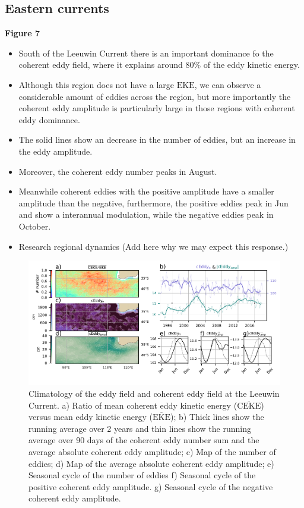 \documentclass[draft,linenumbers]{agujournal2019}
\newcommand{\MEKE}{\overline{\textrm{EKE}}}
\newcommand{\EKE}{\textrm{EKE}}
\newcommand{\MCEKE}{\overline{\textrm{CEKE}}}
\begin{document}
	\subsection{Eastern currents}


	\textbf{Figure 7}
	\begin{itemize}
		\item South of the Leeuwin Current there is an important dominance fo the coherent eddy field, where it explains around 80\% of the eddy kinetic energy.
		\item Although this region does not have a large $\EKE$, we can observe a considerable amount of eddies across the region, but more importantly the coherent eddy amplitude is particularly large in those regions with coherent eddy dominance. 
		\item The solid lines show an decrease in the number of eddies, but an increase in the eddy amplitude. 
		\item Moreover, the coherent eddy number peaks in August.
		\item Meanwhile coherent eddies with the positive amplitude have a smaller amplitude than the negative, furthermore, the positive eddies peak in Jun and show a interannual modulation, while the negative eddies peak in October. 
		\item Research regional dynamics (Add here why we may expect this response.)
	\end{itemize}

	\begin{figure}
	    \centering
	    \includegraphics[width=1\textwidth]{figures/regional_ratios_and_stats_V3_0.pdf}
	    \caption{ Climatology of the eddy field and coherent eddy field at the Leeuwin Current. a) Ratio of mean coherent eddy kinetic energy ($\MCEKE$) versus mean eddy kinetic energy ($\MEKE$); b) Thick lines show the running average over 2 years and thin lines show the running average over 90 days of the coherent eddy number sum and the average absolute coherent eddy amplitude; c) Map of the number of eddies; d) Map of the average absolute coherent eddy amplitude; e) Seasonal cycle of the number of eddies f) Seasonal cycle of the positive coherent eddy amplitude. g) Seasonal cycle of the negative coherent eddy amplitude.}
	    \label{fig:leeuwin_cycle}
	\end{figure}
\end{document}
